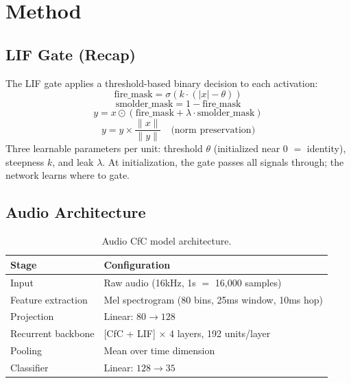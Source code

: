 \documentclass[11pt]{article}
\begin{document}
\section{Method}

\subsection{LIF Gate (Recap)}

The LIF gate applies a threshold-based binary decision to each activation:
\begin{equation}
    \text{fire\_mask} = \sigma(k \cdot (|x| - \theta))
\end{equation}
\begin{equation}
    \text{smolder\_mask} = 1 - \text{fire\_mask}
\end{equation}
\begin{equation}
    y = x \odot (\text{fire\_mask} + \lambda \cdot \text{smolder\_mask})
\end{equation}
\begin{equation}
    y = y \times \frac{\|x\|}{\|y\|}  \quad \text{(norm preservation)}
\end{equation}
Three learnable parameters per unit: threshold $\theta$ (initialized near 0 $=$ identity), steepness $k$, and leak $\lambda$. At initialization, the gate passes all signals through; the network learns where to gate.

\subsection{Audio Architecture}

\begin{table}[h]
\centering
\caption{Audio CfC model architecture.}
\label{tab:architecture}
\begin{tabular}{ll}
\toprule
\textbf{Stage} & \textbf{Configuration} \\
\midrule
Input & Raw audio (16kHz, 1s $=$ 16{,}000 samples) \\
Feature extraction & Mel spectrogram (80 bins, 25ms window, 10ms hop) \\
Projection & Linear: $80 \to 128$ \\
Recurrent backbone & [CfC + LIF] $\times$ 4 layers, 192 units/layer \\
Pooling & Mean over time dimension \\
Classifier & Linear: $128 \to 35$ \\
\bottomrule
\end{tabular}
\end{table}
\end{document}

